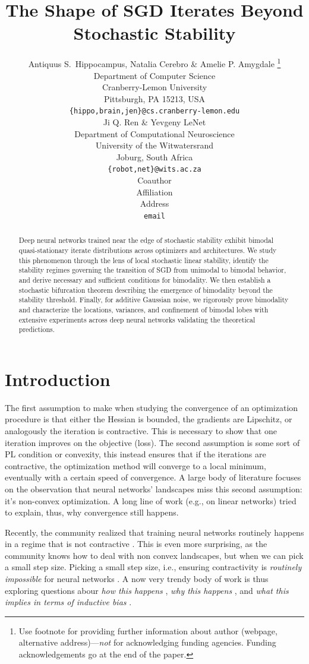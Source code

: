 \documentclass{article} %
\title{The Shape of SGD Iterates Beyond Stochastic Stability}
\author{Antiquus S.~Hippocampus, Natalia Cerebro \& Amelie P. Amygdale \thanks{ Use footnote for providing further information
about author (webpage, alternative address)---\emph{not} for acknowledging
funding agencies.  Funding acknowledgements go at the end of the paper.} \\
Department of Computer Science\\
Cranberry-Lemon University\\
Pittsburgh, PA 15213, USA \\
\texttt{\{hippo,brain,jen\}@cs.cranberry-lemon.edu} \\
\And
Ji Q. Ren \& Yevgeny LeNet \\
Department of Computational Neuroscience \\
University of the Witwatersrand \\
Joburg, South Africa \\
\texttt{\{robot,net\}@wits.ac.za} \\
\AND
Coauthor \\
Affiliation \\
Address \\
\texttt{email}
}
\theoremstyle{plain}
\theoremstyle{definition}
\begin{document}
\maketitle

\begin{abstract}
Deep neural networks trained near the edge of stochastic stability exhibit bimodal quasi-stationary iterate distributions across optimizers and architectures. We study this phenomenon through the lens of local stochastic linear stability, identify the stability regimes governing the transition of SGD from unimodal to bimodal behavior, and derive necessary and sufficient conditions for bimodality. We then establish a stochastic bifurcation theorem describing the emergence of bimodality beyond the stability threshold. Finally, for additive Gaussian noise, we rigorously prove bimodality and characterize the locations, variances, and confinement of bimodal lobes with extensive experiments across deep neural networks validating the theoretical predictions.
\end{abstract}


\section{Introduction}

The first assumption to make when studying the convergence of an optimization procedure is that either the Hessian is bounded, the gradients are Lipschitz, or analogously the iteration is contractive. This is necessary to show that one iteration improves on the objective (loss). The second assumption is some sort of PL condition or convexity, this instead ensures that if the iterations are contractive, the optimization method will converge to a local minimum, eventually with a certain speed of convergence. A large body of literature focuses on the observation that neural networks' landscapes miss this second assumption: it's non-convex optimization. A long line of work (e.g., on linear networks) tried to explain, thus, why convergence still happens. 

Recently, the community realized that training neural networks routinely happens in a regime that is not contractive \citep{xing_walk_2018,cohen_gradient_2021,cohen_adaptive_2022xxx,jastrzebski_relation_2019,jastrzebski_break-even_2020,andreyev_edge_2024}. This is even more surprising, as the community knows how to deal with non convex landscapes, but when we can pick a small step size. Picking a small step size, i.e., ensuring contractivity is \textit{routinely impossible} for neural networks \citep{cohen_gradient_2021,damian_self-stabilization_2023}.
A now very trendy body of work is thus exploring questions abour \textit{how this happens} \citep{dynamical_systems}, \textit{why this happens} \citep{progressive_sharp}, and \textit{what this implies in terms of inductive bias} \citep{kwag}.
\end{document}
